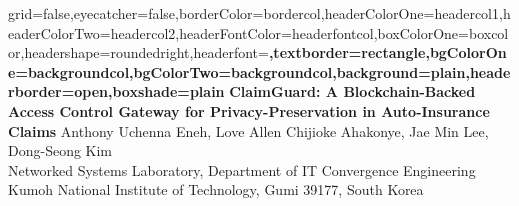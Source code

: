 \documentclass[a0paper,portrait]{baposter}
\begin{document}

\begin{poster}{grid=false,eyecatcher=false,borderColor=bordercol,headerColorOne=headercol1,headerColorTwo=headercol2,headerFontColor=headerfontcol,boxColorOne=boxcolor,headershape=roundedright,headerfont=\Large\sf\bfseries,textborder=rectangle,bgColorOne=backgroundcol,bgColorTwo=backgroundcol,background=plain,headerborder=open,boxshade=plain}
{} %
{\centering\vspace*{0.0em}\sf\bf ClaimGuard: A Blockchain-Backed Access Control
Gateway for Privacy-Preservation in Auto-Insurance
Claims} %
{\centering \vspace{0.2em} \scriptsize Anthony Uchenna Eneh, Love Allen Chijioke Ahakonye, Jae Min Lee, Dong-Seong Kim \\
\vspace{0.2em} \tiny Networked Systems Laboratory, Department of IT Convergence Engineering \\
} %
{\centering\vspace{0.2em} Kumoh National Institute of Technology, Gumi 39177, South Korea
}
%
%


\end{poster}
\end{document}
